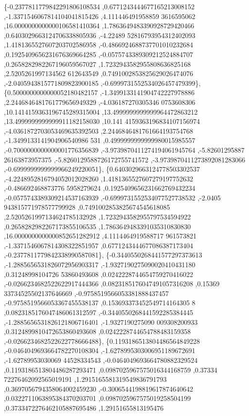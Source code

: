 \begin{DoxyCode}
\{-0.2377811779842291806108534 ,0.6771243444677165213008152 ,-1.3371546067814104041815426 ,4.111446491958859
      3616595062 ,16.0000000000000106581410364 ,1.7863649483390928729420466 ,0.6403029663124706338805936 ,-4.22489
      52816793954312402093 ,1.4181365527607203702586958 ,-0.4866924688737701010232684 ,0.1925409656231676369664285
       ,-0.0575743389309212524884707 ,0.2658282982267196059567027 ,1.7232943582955808636825168 ,2.5205261997134562
      612643549 ,0.7491002853825629026474076 ,-2.0405943815771809823900185 ,-0.6999731552534026457479399\},
\{0.5000000000000052180482157 ,-1.3499133141904742227978886 ,2.2446846481761779656949329 ,-4.036187270305346
      0753608306 ,10.1414159363196745289315004 ,13.4999999999999964472863212 ,13.4999999999999911182158030 ,10.141
      4159363196834107156974 ,-4.0361872703053469635392503 ,2.2446846481761664193754768 ,-1.3499133141904906540986
      531 ,0.4999999999999980015985557 ,-0.7000000000000001776356839 ,-3.9739870411274194061945764 ,-5.82601295887
      26163873957375 ,-5.8260129588726172755741572 ,-3.9739870411273892081283066 ,-0.6999999999999966249220051\},
\{0.6403029663124778503302537 ,-4.2248952816794052012028260 ,1.4181365527607279197752632 ,-0.486692468873776
      5958279624 ,0.1925409656231662769432234 ,-0.0575743389309214537163939 ,-0.6999731552534077527738532 ,-2.0405
      943815771978577799928 ,0.7491002853825674545618085 ,2.5205261997134624785132928 ,1.7232943582955797534594922
       ,0.2658282982267173855106535 ,1.7863649483391035310830830 ,16.0000000000000852651282912 ,4.1114464919588717
      961573821 ,-1.3371546067814308322851957 ,0.6771243444677086387173404 ,-0.2377811779842338990587081\},
\{-0.3440550268441577297373613 ,-1.2885656531826072956903317 ,-1.9327190275090020410431180 ,0.31248998104726
      53860493608 ,0.0242228744654759270416022 ,-0.0266234682522622917444366 ,0.0823185176047491057316208 ,0.15369
      33734525502137646669 ,-0.9758519566053381888437457 ,-0.9758519566053367455538137 ,0.153693373452549714164305
      8 ,0.0823185176047486061312597 ,-0.3440550268441592285384445 ,-1.2885656531826121806716401 ,-1.9327190275090
      009308200933 ,0.3124899810472653860493608 ,0.0242228744654788483159358 ,-0.0266234682522622778666488\},
\{0.1193186513804486564849228 ,-0.0464049693664782270108304 ,-1.6278995303006951189672691 ,-1.62789953030069
      44528334543 ,-0.0464049693664780882329524 ,0.1193186513804486287293471 ,0.0987025967575016344168759 ,0.37334
      72276462092565019191 ,1.2915165581319549836791793 ,0.3697056794358064002459230 ,-0.3006544198819617874640642
       ,0.0322711063895384370203701 ,0.0987025967575019258504199 ,0.3733472276462105887695486 ,1.29151655813195476

\end{DoxyCode}
